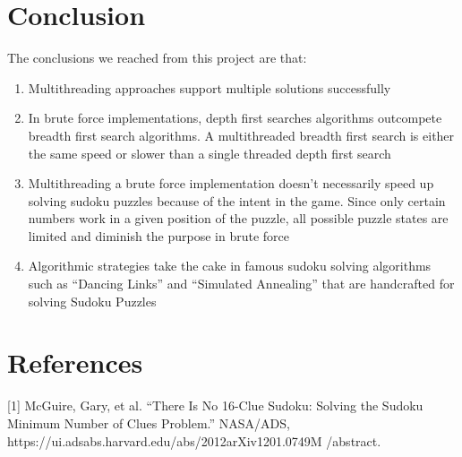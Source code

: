 \documentclass[conference]{IEEEtran}
\begin{document}
\section{Conclusion}
The conclusions we reached from this project are that: 
\begin{enumerate}
\item Multithreading approaches support multiple solutions successfully
\item In brute force implementations, depth first searches algorithms outcompete breadth first search algorithms.
A multithreaded breadth first search is either the same speed or slower than a single threaded depth first search
\item Multithreading a brute force implementation doesn’t necessarily speed up solving sudoku puzzles because of the intent in the game.
Since only certain numbers work in a given position of the puzzle, all possible puzzle states are limited and diminish the purpose in brute force
\item Algorithmic strategies take the cake in famous sudoku solving algorithms such as “Dancing Links” and “Simulated Annealing” that are handcrafted for solving Sudoku Puzzles
\end{enumerate}


\section*{References}

\vspace{1\baselineskip}
[1] McGuire, Gary, et al. “There Is No 16-Clue Sudoku: Solving the Sudoku Minimum Number of Clues Problem.” NASA/ADS, https://ui.adsabs.harvard.edu/abs/2012arXiv1201.0749M
/abstract. 


\printbibliography
\end{document}
